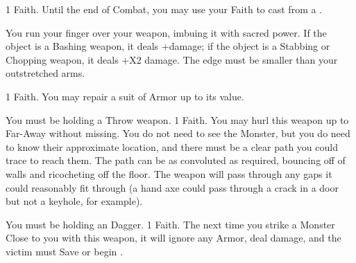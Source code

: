 \begin{multicols*}{2}
\LITURGY [
  Name = Hecate's Blessing,
  Link = arcana-mystery-hecates-blessing,
  Paradigm = Cunning,
  Duration=1 Maneuver Action
]

 1 Faith. Until the end of Combat, you may use your Faith to cast  from a .

\LITURGY [
  Name = Hone,
  Link = arcana-mystery-hone,
  Paradigm = Civilized,
  Duration=1 Maneuver Action
]

You run your finger over your weapon, imbuing it with sacred power. If the object is a Bashing weapon, it deals +\DICE damage; if the object is a Stabbing or Chopping weapon, it deals +\DICE X2 damage. The edge must be smaller than your outstretched arms.


\LITURGY [
  Name = Indomitable Mail,
  Link = arcana-mystery-instantaneous-repair,
  Paradigm = Civilized,
  Duration=1 Maneuver Action
]

 1 Faith. You may repair a suit of Armor up to its \MAX value.

\cbreak


\newpage

\LITURGY [
  Name = Lucky Throw,
  Link = arcana-mystery-lucky-throw,
  Paradigm = Ruinous,
  Duration=1 Maneuver Action
]

 You must be holding a Throw weapon.  1 Faith.  You may hurl this weapon up to Far-Away without missing. You do not need to see the Monster, but you do need to know their approximate location, and there must be a clear path you could trace to reach them. The path can be as convoluted as required, bouncing off of walls and ricocheting off the floor. The weapon will pass through any gaps it could reasonably fit through (a hand axe could pass through a crack in a door but not a keyhole, for example).


\LITURGY [
  Name = Misericorde,
  Link = arcana-mystery-misericorde,
  Paradigm = Cthonic,
  Duration=1 Maneuver Action
]

You must be holding an  Dagger.  1 Faith.  The next time you strike a Monster Close to you with this weapon, it will ignore any Armor, deal \MAX damage, and the victim must Save or begin .

\LITURGY [
  Name = Monstrous Aspect,
  Link = arcana-mystery-monstrous-aspect,
  Paradigm = Monstrous,
  Duration=\DICE Maneuvers
]


\end{multicols*}
